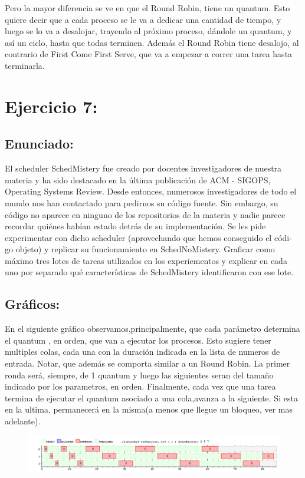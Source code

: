 \documentclass[10pt, a4paper]{article}
\begin{document}
Pero la mayor diferencia se ve en que el Round Robin, tiene un quantum. Esto quiere decir que a cada proceso se le va a dedicar una cantidad de tiempo, y luego se lo va a desalojar, trayendo al próximo proceso, dándole un quantum, y así un ciclo, hasta que todas  terminen. Además el Round Robin tiene desalojo, al contrario de First Come First Serve, que va a empezar a correr una tarea hasta terminarla.


\section{Ejercicio 7:}

\subsection{Enunciado:}
El scheduler SchedMistery fue creado por docentes investigadores de nuestra
materia y ha sido destacado en la última publicación de ACM - SIGOPS, Operating Systems
Review. Desde entonces, numerosos investigadores de todo el mundo nos han contactado para
pedirnos su código fuente. Sin embargo, su código no aparece en ninguno de los repositorios
de la materia y nadie parece recordar quiénes habían estado detrás de su implementación.
Se les pide experimentar con dicho scheduler (aprovechando que hemos conseguido el códi-
go objeto) y replicar su funcionamiento en SchedNoMistery. Graficar como máximo tres lotes
de tareas utilizados en los experiementos y explicar en cada uno por separado qué características de SchedMistery identificaron con ese lote.


\subsection{Gráficos:}

En el siguiente gráfico observamos,principalmente, que  cada parámetro determina el quantum , en orden, que van a ejecutar los procesos. Esto sugiere tener multiples colas, cada una con la duración indicada en la lista de numeros de entrada. Notar, que además se comporta similar a un Round Robin. La primer ronda será, siempre, de 1 quantum y luego las siguientes seran del tamaño indicado por los parametros, en orden. 
Finalmente, cada vez que una tarea termina de ejecutar el quantum asociado a una cola,avanza a la siguiente. Si esta en la ultima, permanecerá en la misma(a menos que llegue un bloqueo, ver mas adelante).

\begin{figure}[H]
  	\centering
   	\includegraphics[width=1\textwidth]
   	 {imgs/mistery2.png}
	\caption{}
\end{figure}
\end{document}
